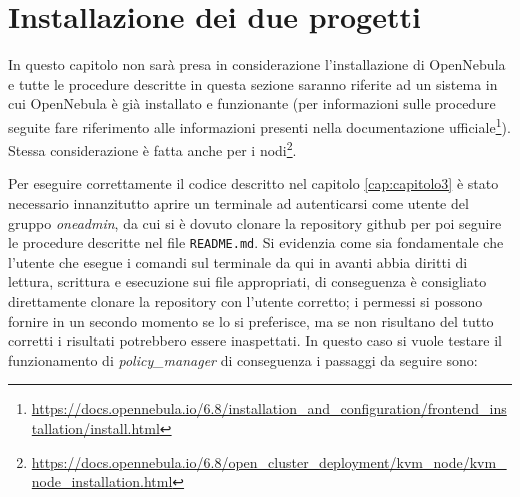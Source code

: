 \section{Installazione dei due progetti}
In questo capitolo non sarà presa in considerazione l'installazione di OpenNebula e tutte le procedure descritte in questa sezione saranno riferite ad un sistema in cui OpenNebula è già installato e funzionante (per informazioni sulle procedure seguite fare riferimento alle informazioni presenti nella documentazione ufficiale\footnote{\url{https://docs.opennebula.io/6.8/installation\_and\_configuration/frontend\_installation/install.html}}). Stessa considerazione è fatta anche per i nodi\footnote{\url{https://docs.opennebula.io/6.8/open\_cluster\_deployment/kvm\_node/kvm\_node\_installation.html}}.\par
Per eseguire correttamente il codice descritto nel capitolo \ref{cap:capitolo3} è stato necessario innanzitutto aprire un terminale ad autenticarsi come utente del gruppo \emph{oneadmin}, da cui si è dovuto clonare la repository github per poi seguire le procedure descritte nel file \texttt{README.md}. Si evidenzia come sia fondamentale che l'utente che esegue i comandi sul terminale da qui in avanti abbia diritti di lettura, scrittura e esecuzione sui file appropriati, di conseguenza è consigliato direttamente clonare la repository con l'utente corretto; i permessi si possono fornire in un secondo momento se lo si preferisce, ma se non risultano del tutto corretti i risultati potrebbero essere inaspettati.
In questo caso si vuole testare il funzionamento di \emph{policy\_manager} di conseguenza i passaggi da seguire sono:
